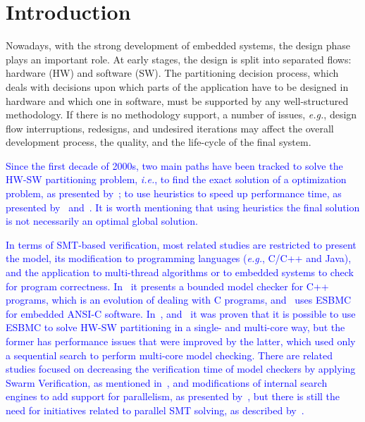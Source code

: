 \documentclass{doublecol-new}
\theoremstyle{TH}{
\newtheorem{lemma}{Lemma}
\newtheorem{theorem}[lemma]{Theorem}
\newtheorem{corrolary}[lemma]{Corrolary}
\newtheorem{conjecture}[lemma]{Conjecture}
\newtheorem{proposition}[lemma]{Proposition}
\newtheorem{claim}[lemma]{Claim}
\newtheorem{stheorem}[lemma]{Wrong Theorem}
\newtheorem{algorithm}{Algorithm}
}
\theoremstyle{THrm}{
\newtheorem{definition}{Definition}[section]
\newtheorem{question}{Question}[section]
\newtheorem{remark}{Remark}
\newtheorem{scheme}{Scheme}
}
\theoremstyle{THhit}{
\newtheorem{case}{Case}[section]
}
\begin{document}
\section{Introduction}

Nowadays, with the strong development of embedded systems, the design phase plays an important role. At early stages, the design is split into separated flows: hardware (HW) and software (SW). The partitioning decision process, which deals with decisions upon which parts of the application have to be designed in hardware and which one in software, must be supported by any well-structured methodology. If there is no methodology support, a number of issues, {\it e.g.}, design flow interruptions, redesigns, and undesired iterations may affect the overall development process, the quality, and the life-cycle of the final system.

\textcolor{blue}{Since the first decade of 2000s, two main paths have been tracked to solve the HW-SW partitioning problem, {\it i.e.}, to find the exact solution of a optimization problem, as presented by~\cite{Mann2007}; to use heuristics to speed up performance time, as presented by~\cite{Arato2003} and~\cite{Arato2005}. It is worth mentioning that using heuristics the final solution is not necessarily an optimal global solution.} 

\textcolor{blue}{In terms of SMT-based verification, most related studies are restricted to present the model, its modification to programming languages ({\it e.g.}, C/C++ and Java), and the application to multi-thread algorithms or to embedded systems to check for program correctness. In~\cite{Ramalho2013} it presents a bounded model checker for C++ programs, which is an evolution of dealing with C programs, and~\cite{Cordeiro2012} uses ESBMC for embedded ANSI-C software. In~\cite{Trindade2015}, and~\cite{Trindade2016} it was proven that it is possible to use ESBMC to solve HW-SW partitioning in a single- and multi-core way, but the former has performance issues that were improved by the latter, which used only a sequential search to perform multi-core model checking. There are related studies focused on decreasing the verification time of model checkers by applying Swarm Verification, as mentioned in~\cite{Holzmann2011}, and modifications of internal search engines to add support for parallelism, as presented by~\cite{Holzmann2012}, but there is still the need for initiatives related to parallel SMT solving, as described by~\cite{Wintersteiger2009}.} 
\end{document}
